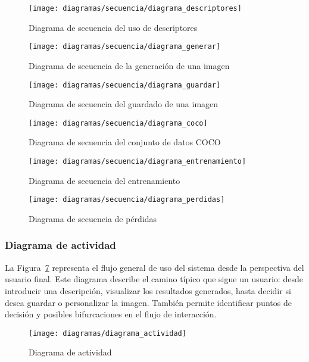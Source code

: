 \begin{figure}[H]
    \centering
    \texttt{[image: diagramas/secuencia/diagrama\_descriptores]}
    \caption{Diagrama de secuencia del uso de descriptores}
    \label{fig:diagrama-coco}
\end{figure}

\begin{figure}[H]
    \centering
    \texttt{[image: diagramas/secuencia/diagrama\_generar]}
    \caption{Diagrama de secuencia de la generación de una imagen}
    \label{fig:diagrama-generar}
\end{figure}

\begin{figure}[H]
    \centering
    \texttt{[image: diagramas/secuencia/diagrama\_guardar]}
    \caption{Diagrama de secuencia del guardado de una imagen}
    \label{fig:diagrama-guardar}
\end{figure}

\begin{figure}[H]
    \centering
    \texttt{[image: diagramas/secuencia/diagrama\_coco]}
    \caption{Diagrama de secuencia del conjunto de datos COCO}
    \label{fig:diagrama-coco}
\end{figure}

\begin{figure}[H]
    \centering
    \texttt{[image: diagramas/secuencia/diagrama\_entrenamiento]}
    \caption{Diagrama de secuencia del entrenamiento}
    \label{fig:diagrama-secuencia-entrenamiento}
\end{figure}

\begin{figure}[H]
    \centering
    \texttt{[image: diagramas/secuencia/diagrama\_perdidas]}
    \caption{Diagrama de secuencia de pérdidas}
    \label{fig:diagrama-secuencia-perdidas}
\end{figure}

\subsubsection{Diagrama de actividad}
La Figura~\ref{fig:diagrama-actividad} representa el flujo general de uso del sistema desde la perspectiva del usuario final. Este diagrama describe el camino típico que sigue un usuario: desde introducir una descripción, visualizar los resultados generados, hasta decidir si desea guardar o personalizar la imagen. También permite identificar puntos de decisión y posibles bifurcaciones en el flujo de interacción.

\begin{figure}[H]
    \centering
    \texttt{[image: diagramas/diagrama\_actividad]}
    \caption{Diagrama de actividad}
    \label{fig:diagrama-actividad}
\end{figure}


